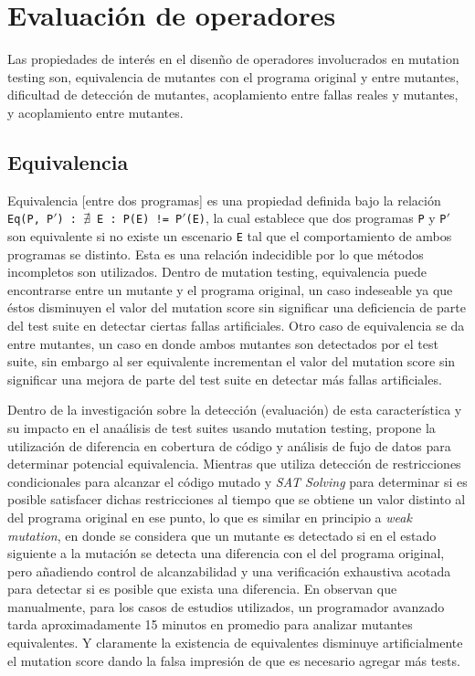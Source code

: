 \section{Evaluaci\'on de operadores}
\label{sec:preliminares.mutation.opevaluation}

Las propiedades de inter\'es en el disen\~no  de operadores involucrados en mutation testing son, equivalencia de mutantes con el programa original y entre mutantes, dificultad de detecci\'on de mutantes, acoplamiento entre fallas reales y mutantes, y acoplamiento entre mutantes.

\subsection{Equivalencia}
Equivalencia [entre dos programas] es una propiedad definida bajo la relaci\'on \texttt{Eq(P, P$\prime$) : $\nexists$ E : P(E) != P$\prime$(E)}, la cual establece que dos programas \texttt{P} y \texttt{P$\prime$} son equivalente si no existe un escenario \texttt{E} tal que el comportamiento de ambos programas se distinto. Esta es una relaci\'on indecidible por lo que m\'etodos incompletos son utilizados. Dentro de mutation testing, equivalencia puede encontrarse entre un mutante y el programa original, un caso indeseable ya que \'estos disminuyen el valor del mutation score sin significar una deficiencia de parte del test suite en detectar ciertas fallas artificiales. Otro caso de equivalencia se da entre mutantes, un caso en donde ambos mutantes son detectados por el test suite, sin embargo al ser equivalente incrementan el valor del mutation score sin significar una mejora de parte del test suite en detectar m\'as fallas artificiales.

Dentro de la investigaci\'on sobre la detecci\'on (evaluaci\'on) de esta caracter\'istica y su impacto en el ana\'alisis de test suites usando mutation testing, \cite{biblography.mutation.evaluation.equivalent.Schuler+10} propone la utilizaci\'on de diferencia en cobertura de c\'odigo y an\'alisis de fujo de datos para determinar potencial equivalencia. Mientras que  \cite{biblography.mutation.evaluation.equivalent.Just+13} utiliza detecci\'on de restricciones condicionales para alcanzar el c\'odigo mutado y \emph{SAT Solving} para determinar si es posible satisfacer dichas restricciones al tiempo que se obtiene un valor distinto al del programa original en ese punto, lo que es similar en principio a \emph{weak mutation}, en donde se considera que un mutante es detectado si en el estado siguiente a la mutaci\'on se detecta una diferencia con el del programa original, pero a\~nadiendo control de alcanzabilidad y una verificaci\'on exhaustiva acotada para detectar si es posible que exista una diferencia.
En \cite{biblography.mutation.evaluation.equivalent.Grun+09} observan que manualmente, para los casos de estudios utilizados, un programador avanzado tarda aproximadamente 15 minutos en promedio para analizar mutantes equivalentes. Y claramente la existencia de equivalentes disminuye artificialmente el mutation score dando la falsa impresi\'on de que es necesario agregar m\'as tests.

